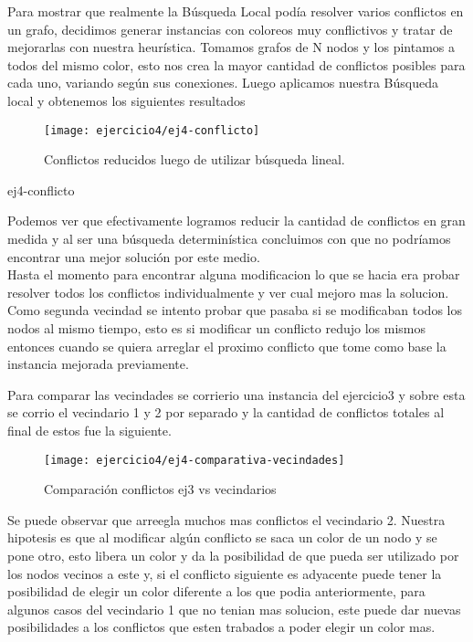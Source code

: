 Para mostrar que realmente la B\'usqueda Local pod\'ia resolver varios conflictos en un grafo, decidimos generar instancias con coloreos muy conflictivos y tratar de mejorarlas con nuestra heur\'istica.
Tomamos grafos de N nodos y los pintamos a todos del mismo color, esto nos crea la mayor cantidad de conflictos posibles para cada uno, variando seg\'un sus conexiones. Luego aplicamos nuestra B\'usqueda local y obtenemos los siguientes resultados

\begin{figure}[h!]
\texttt{[image: ejercicio4/ej4-conflicto]}
\centering
\caption{Conflictos reducidos luego de utilizar b\'usqueda lineal.}
\label{overflow3}
\end{figure}
ej4-conflicto

Podemos ver que efectivamente logramos reducir la cantidad de conflictos en gran medida y al ser una b\'usqueda determin\'istica concluimos con que no podr\'iamos encontrar una mejor soluci\'on por este medio. \\


Hasta el momento para encontrar alguna modificacion lo que se hacia era probar resolver todos los conflictos individualmente y ver cual mejoro mas la solucion. Como segunda vecindad se intento probar que pasaba si se modificaban todos los nodos al mismo tiempo, esto es si modificar un conflicto redujo los mismos entonces cuando se quiera arreglar el proximo conflicto que tome como base la instancia mejorada previamente.

Para comparar las vecindades se corrierio una instancia del ejercicio3 y sobre esta se corrio el vecindario 1 y 2 por separado y la cantidad de conflictos totales al final de estos fue la siguiente.

\begin{figure}[h!]
\texttt{[image: ejercicio4/ej4-comparativa-vecindades]}
\centering
\caption{Comparaci\'on conflictos ej3 vs vecindarios}
\label{overflow3}
\end{figure}

Se puede observar que arreegla muchos mas conflictos el vecindario 2. Nuestra hipotesis es que al modificar alg\'un conflicto se saca un color de un nodo y se pone otro, esto libera un color y da la posibilidad de que pueda ser utilizado por los nodos vecinos a este y, si el conflicto siguiente es adyacente puede tener la posibilidad de elegir un color diferente a los que podia anteriormente, para algunos casos del vecindario 1 que no tenian mas solucion, este puede dar nuevas posibilidades a los conflictos que esten trabados a poder elegir un color mas.

\pagebreak


